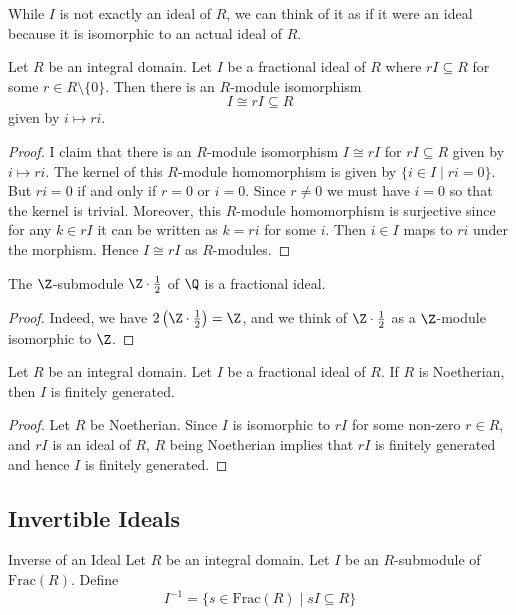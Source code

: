 \documentclass[a4paper]{article}
\begin{document}
While $I$ is not exactly an ideal of $R$, we can think of it as if it were an ideal because it is isomorphic to an actual ideal of $R$. 

\begin{lmm}{}{} Let $R$ be an integral domain. Let $I$ be a fractional ideal of $R$ where $rI\subseteq R$ for some $r\in R\setminus\{0\}$. Then there is an $R$-module isomorphism $$I\cong rI\subseteq R$$ given by $i\mapsto ri$. 
\begin{proof}
I claim that there is an $R$-module isomorphism $I\cong rI$ for $rI\subseteq R$ given by $i\mapsto ri$. The kernel of this $R$-module homomorphism is given by $\{i\in I\;|\;ri=0\}$. But $ri=0$ if and only if $r=0$ or $i=0$. Since $r\neq 0$ we must have $i=0$ so that the kernel is trivial. Moreover, this $R$-module homomorphism is surjective since for any $k\in rI$ it can be written as $k=ri$ for some $i$. Then $i\in I$ maps to $ri$ under the morphism. Hence $I\cong rI$ as $R$-modules. 
\end{proof}
\end{lmm}

\begin{eg}{}{} The $\Z$-submodule $\Z\cdot\frac{1}{2}$ of $\Q$ is a fractional ideal. 
\begin{proof}
Indeed, we have $2\left(\Z\cdot\frac{1}{2}\right)=\Z$, and we think of $\Z\cdot\frac{1}{2}$ as a $\Z$-module isomorphic to $\Z$. 
\end{proof}
\end{eg}

\begin{lmm}{}{} Let $R$ be an integral domain. Let $I$ be a fractional ideal of $R$. If $R$ is Noetherian, then $I$ is finitely generated. 
\begin{proof}
Let $R$ be Noetherian. Since $I$ is isomorphic to $rI$ for some non-zero $r\in R$, and $rI$ is an ideal of $R$, $R$ being Noetherian implies that $rI$ is finitely generated and hence $I$ is finitely generated. 
\end{proof}
\end{lmm}

\subsection{Invertible Ideals}
\begin{defn}{Inverse of an Ideal}{} Let $R$ be an integral domain. Let $I$ be an $R$-submodule of $\text{Frac}(R)$. Define $$I^{-1}=\{s\in\text{Frac}(R)\;|\;sI\subseteq R\}$$
\end{defn}
\end{document}
